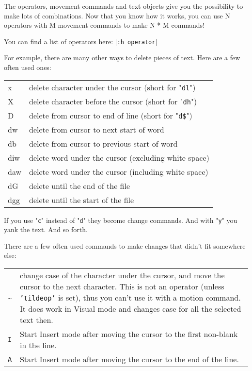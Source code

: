 The operators, movement commands and text objects give you the possibility to make lots of combinations.
Now that you know how it works, you can use N operators with M movement commands to make N * M commands!

You can find a list of operators here: |\texttt{:h operator}|

For example, there are many other ways to delete pieces of text.
Here are a few often used ones:

\begin{longtable}{l l}
				x & delete character under the cursor (short for "\texttt{dl}") \\
				X & delete character before the cursor (short for "\texttt{dh}") \\
				D & delete from cursor to end of line (short for "\texttt{d\$}") \\
				dw & delete from cursor to next start of word \\
				db & delete from cursor to previous start of word \\
				diw & delete word under the cursor (excluding white space) \\
				daw & delete word under the cursor (including white space) \\
				dG & delete until the end of the file \\
				dgg & delete until the start of the file \\
\end{longtable}

If you use "\texttt{c}" instead of "\texttt{d}" they become change commands.
And with "\texttt{y}" you yank the text.
And so forth.

There are a few often used commands to make changes that didn't fit somewhere else:

\begin{tabularx}{\textwidth}{l X}
				\textasciitilde & 
				change case of the character under the cursor, and move the cursor to the next character.
				This is not an operator (unless \texttt{'tildeop'} is set), thus you can't use it with a motion command.
				It does work in Visual mode and changes case for all the selected text then. \\

				\texttt{I} &
				Start Insert mode after moving the cursor to the first non-blank in the line.\\

				\texttt{A} & 
				Start Insert mode after moving the cursor to the end of the line.
\end{tabularx}
\clearpage
